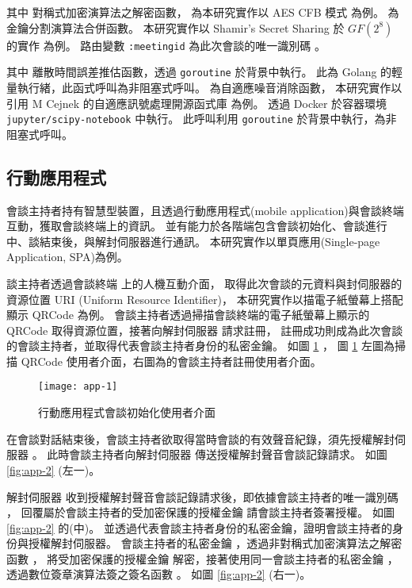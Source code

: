 \begin{enumerate}
        其中 \DEFfuncDecEK{} 對稱式加密演算法之解密函數，
    為本研究實作以 AES CFB 模式 \cite{117146}\cite{9171} 為例。
    \DEFfuncSSC{} 為金鑰分割演算法合併函數。
    本研究實作以 Shamir's Secret Sharing \cite{shamir1979share} 於 $GF(2^8)$ 的實作 \cite{117146} 為例。
    路由變數 \texttt{:meetingid} 為此次會談的唯一識別碼 \DEFsessionID。

        其中 \DEFfuncEstm{} 離散時間誤差推估函數，透過 \texttt{goroutine} 於背景中執行。
    此為 Golang 的輕量執行緒，此函式呼叫為非阻塞式呼叫。
    \DEFfuncAnc{} 為自適應噪音消除函數，
    本研究實作以引用 M Cejnek 的自適應訊號處理開源函式庫 \cite{cejnek2017padasip} 為例。
    透過 Docker 於容器環境 \texttt{jupyter/scipy-notebook} 中執行。
    此呼叫利用 \texttt{goroutine} 於背景中執行，為非阻塞式呼叫。
\end{enumerate}


\subsection{行動應用程式}

    會談主持者持有智慧型裝置，且透過行動應用程式(mobile application)與會談終端互動，獲取會談終端上的資訊。
並有能力於各階端包含會談初始化、會談進行中、談結束後，與解封伺服器進行通訊。
本研究實作以單頁應用(Single-page Application, SPA)為例。

    談主持者透過會談終端 \DEFmeetingbox 上的人機互動介面，
取得此次會談的元資料與封伺服器的資源位置 URI (Uniform Resource Identifier)，
本研究實作以描電子紙螢幕上搭配顯示 QRCode 為例。
會談主持者透過掃描會談終端的電子紙螢幕上顯示的 QRCode 取得資源位置，接著向解封伺服器 \DEFserver 請求註冊，
註冊成功則成為此次會談的會談主持者，並取得代表會談主持者身份的私密金鑰。
如圖 \ref{fig:app-1} ，
圖 \ref{fig:app-1} 左圖為掃描 QRCode 使用者介面，右圖為的會談主持者註冊使用者介面。

\begin{figure}[H]
    \centering
    \texttt{[image: app-1]}
    \caption{行動應用程式會談初始化使用者介面}\label{fig:app-1}
\end{figure}

    在會談對話結束後，會談主持者欲取得當時會談的有效聲音紀錄，須先授權解封伺服器 \DEFserver。
此時會談主持者向解封伺服器 \DEFserver 傳送授權解封聲音會談記錄請求。
如圖 \ref{fig:app-2} (左一)。

    解封伺服器 \DEFserver 收到授權解封聲音會談記錄請求後，即依據會談主持者的唯一識別碼 \DEFownerID，
回覆屬於會談主持者的受加密保護的授權金鑰 \DEFakEnc 請會談主持者簽署授權。
如圖 \ref{fig:app-2} 的(中)。
並透過代表會談主持者身份的私密金鑰，證明會談主持者的身份與授權解封伺服器。
會談主持者的私密金鑰 \DEFprivateKey，透過非對稱式加密演算法之解密函數 \DEFfuncDecSK{}，
將受加密保護的授權金鑰 \DEFakEnc 解密，接著使用同一會談主持者的私密金鑰 \DEFprivateKey，
透過數位簽章演算法簽之簽名函數 \DEFfuncSignSK{}。
如圖 \ref{fig:app-2} (右一)。

